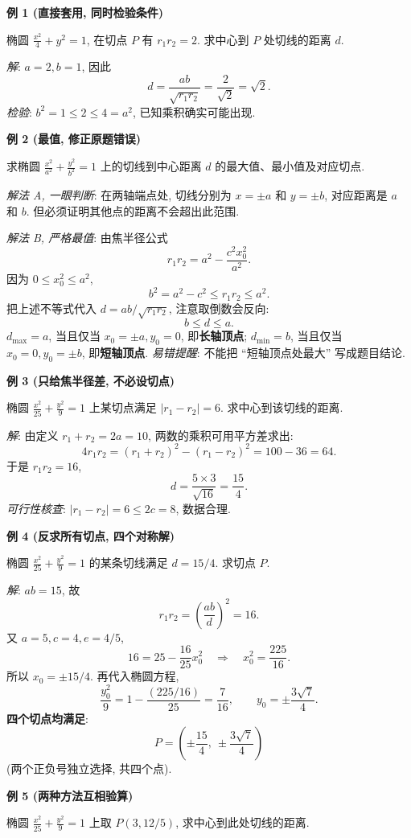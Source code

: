 \begin{examplebox}
\textbf{例 1 (直接套用, 同时检验条件)}

椭圆 $\frac{x^2}{4}+y^2=1$, 在切点 $P$ 有 $r_1r_2=2$.
求中心到 $P$ 处切线的距离 $d$.

\textit{解}: $a=2,b=1$, 因此
\[
d=\frac{ab}{\sqrt{r_1r_2}}=\frac2{\sqrt2}=\boxed{\sqrt2}.
\]
\textit{检验}: $b^2=1\le2\le4=a^2$, 已知乘积确实可能出现.

\medskip
\textbf{例 2 (最值, 修正原题错误)}

求椭圆 $\frac{x^2}{a^2}+\frac{y^2}{b^2}=1$ 上的切线到中心距离 $d$ 的最大值、最小值及对应切点.

\textit{解法 A, 一眼判断}: 在两轴端点处, 切线分别为 $x=\pm a$ 和 $y=\pm b$, 对应距离是 $a$ 和 $b$.
但必须证明其他点的距离不会超出此范围.

\textit{解法 B, 严格最值}: 由焦半径公式
\[
r_1r_2=a^2-\frac{c^2x_0^2}{a^2}.
\]
因为 $0\le x_0^2\le a^2$,
\[
b^2=a^2-c^2\le r_1r_2\le a^2.
\]
把上述不等式代入 $d=ab/\sqrt{r_1r_2}$, 注意取倒数会反向:
\[
\boxed{b\le d\le a}.
\]
$d_{\max}=a$, 当且仅当 $x_0=\pm a,y_0=0$, 即\textbf{长轴顶点};
$d_{\min}=b$, 当且仅当 $x_0=0,y_0=\pm b$, 即\textbf{短轴顶点}.
\textit{易错提醒}: 不能把 ``短轴顶点处最大'' 写成题目结论.

\medskip
\textbf{例 3 (只给焦半径差, 不必设切点)}

椭圆 $\frac{x^2}{25}+\frac{y^2}{9}=1$ 上某切点满足 $|r_1-r_2|=6$.
求中心到该切线的距离.

\textit{解}: 由定义 $r_1+r_2=2a=10$, 两数的乘积可用平方差求出:
\[
4r_1r_2=(r_1+r_2)^2-(r_1-r_2)^2
=100-36=64.
\]
于是 $r_1r_2=16$,
\[
\boxed{d=\frac{5\times3}{\sqrt{16}}=\frac{15}{4}}.
\]
\textit{可行性核查}: $|r_1-r_2|=6\le2c=8$, 数据合理.

\medskip
\textbf{例 4 (反求所有切点, 四个对称解)}

椭圆 $\frac{x^2}{25}+\frac{y^2}{9}=1$ 的某条切线满足 $d=15/4$.
求切点 $P$.

\textit{解}: $ab=15$, 故
\[
r_1r_2=\left(\frac{ab}{d}\right)^2=16.
\]
又 $a=5,c=4,e=4/5$,
\[
16=25-\frac{16}{25}x_0^2
\quad\Longrightarrow\quad x_0^2=\frac{225}{16}.
\]
所以 $x_0=\pm15/4$. 再代入椭圆方程,
\[
\frac{y_0^2}{9}=1-\frac{(225/16)}{25}
=\frac7{16},\qquad y_0=\pm\frac{3\sqrt7}{4}.
\]
\textbf{四个切点均满足}:
\[
\boxed{P=\left(\pm\frac{15}{4},\ \pm\frac{3\sqrt7}{4}\right)}
\]
(两个正负号独立选择, 共四个点).

\medskip
\textbf{例 5 (两种方法互相验算)}

椭圆 $\frac{x^2}{25}+\frac{y^2}{9}=1$ 上取
$P(3,12/5)$, 求中心到此处切线的距离.


\end{examplebox}

